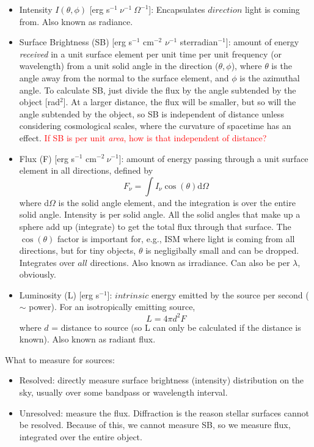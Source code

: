 \documentclass[12pt]{article}
\begin{document}
\begin{itemize}
    \item Intensity $I(\theta,\phi)$ [erg s$^{-1}\ \nu^{-1}\ \Omega^{-1}$]:
        Encapsulates $direction$ light is coming from.
        Also known as radiance.
    \item Surface Brightness (SB)
        [erg s$^{-1}$ cm$^{-2}$ $\nu^{-1}$ sterradian$^{-1}$]:
        amount of energy \emph{received} in a unit surface
        element per unit time per unit frequency (or wavelength)
        from a unit
        solid angle in the direction ($\theta,\phi$), where $\theta$
        is the angle
        away from the normal to the surface element, and $\phi$ is the
        azimuthal angle.
        To calculate SB, just divide the flux by the angle subtended
        by the object [rad$^{2}$]. At a larger distance, the flux will
        be smaller, but so will the angle subtended by the object, so
        SB is independent of distance unless considering cosmological
        scales, where the curvature of spacetime has an effect.
        \textcolor{red}{If SB is per unit \emph{area}, how is that
        independent of distance?}
    \item Flux (F) [erg s$^{-1}$ cm$^{-2}\ \nu^{-1}$]:
        amount of energy passing through a unit surface element
        in all directions, defined by
        \begin{equation}
            F_{\nu} = \int I_{\nu}\cos(\theta)\textrm{d}\Omega
        \end{equation}
        where d$\Omega$ is the solid angle element, and the integration is
        over the entire solid angle. Intensity is per solid angle. All
        the solid angles that make up a sphere add up (integrate) to
        get the total flux through that surface.
        The $\cos(\theta)$ factor is important
        for, e.g., ISM where light is coming from all directions, but for
        tiny objects, $\theta$ is negligibally small and can be dropped.
        Integrates over $all$ directions.
        Also known as irradiance. Can also be per $\lambda$, obviously.
    \item Luminosity (L) [erg s$^{-1}$]:
        $intrinsic$ energy emitted by the source per
        second ($\sim$ power). For an isotropically emitting source,
        \begin{equation}
            L = 4 \pi d^{2} F
        \end{equation}
        where $d$ = distance to source (so L can only be calculated if
        the distance is known). Also known as radiant flux.
\end{itemize}
What to measure for sources:
\begin{itemize}
    \item Resolved: directly measure surface brightness (intensity)
        distribution on the sky, usually over some bandpass or wavelength
        interval.
    \item Unresolved: measure the flux. Diffraction is the reason stellar
        surfaces cannot be resolved. Because of this, we cannot measure
        SB, so we measure flux, integrated over the entire object.
\end{itemize}
\end{document}
